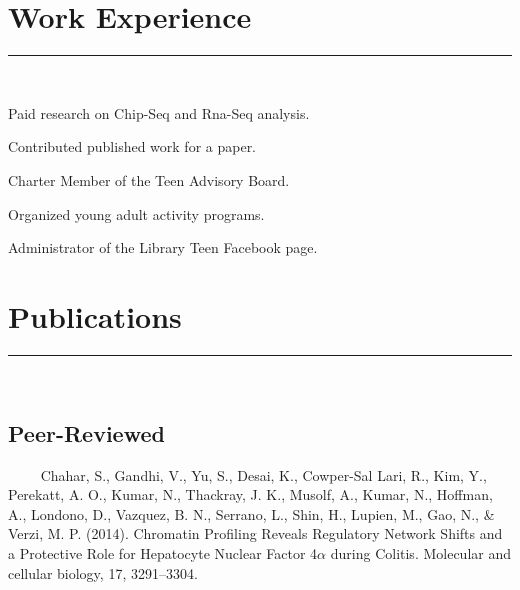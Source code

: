 \documentclass[letterpaper]{deedy-resume} %
\begin{document}
\section{Work Experience}
\normalfont
\hrule height .1pt \leavevmode \\
\vspace{2 mm}
\hfill
{}
\hfill
{}
\vspace{1 mm}
\begin{tightitemize}
	\item Paid research on Chip-Seq and Rna-Seq analysis. 
	\item Contributed published work for a paper.
\end{tightitemize}
\sectionspace %
\vspace{2 mm}
\hfill
{}
\hfill
{}
\vspace{1 mm}
\begin{tightitemize}
	\item Charter Member of the Teen Advisory Board. 
	\item Organized young adult activity programs.
	\item Administrator of the Library Teen Facebook page. 
\end{tightitemize}
\sectionspace

\section{Publications}
\normalfont
\hrule height .1pt \leavevmode \\
\vspace{2 mm}
\subsection{Peer-Reviewed}
\quad \ \ \textbullet{} \ \ Chahar, S., Gandhi, V., Yu, S., Desai, K., Cowper-Sal Lari, R., Kim, Y., Perekatt, A. O., Kumar, N., Thackray, J. K., Musolf, A., Kumar, N., Hoffman, A., Londono, D., Vazquez, B. N., Serrano, L., Shin, H., Lupien, M., Gao, N., \& Verzi, M. P. (2014). Chromatin Profiling Reveals Regulatory Network Shifts and a Protective Role for Hepatocyte Nuclear Factor 4$\alpha$ during Colitis. Molecular and cellular biology, 17, 3291–3304.
\end{document}

